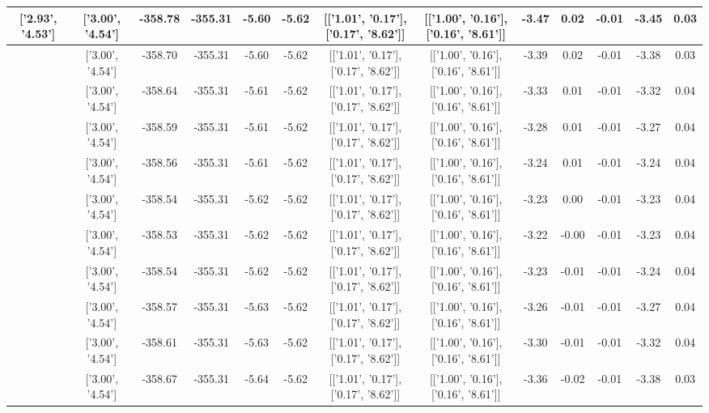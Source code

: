 \begin{table}[htbp]
\begin{adjustbox}{angle=90}
\begin{tabular}{|c|c|c|c|c|c|c|c|c|c|c|c|c|}
 ['2.93', '4.53'] & ['3.00', '4.54'] & -358.78 & -355.31 & -5.60 & -5.62 & [['1.01', '0.17'], ['0.17', '8.62']] & [['1.00', '0.16'], ['0.16', '8.61']] & -3.47 & 0.02 & -0.01 & -3.45 & 0.03\\ \hline
 ['2.94', '4.53'] & ['3.00', '4.54'] & -358.70 & -355.31 & -5.60 & -5.62 & [['1.01', '0.17'], ['0.17', '8.62']] & [['1.00', '0.16'], ['0.16', '8.61']] & -3.39 & 0.02 & -0.01 & -3.38 & 0.03\\ \hline
 ['2.95', '4.54'] & ['3.00', '4.54'] & -358.64 & -355.31 & -5.61 & -5.62 & [['1.01', '0.17'], ['0.17', '8.62']] & [['1.00', '0.16'], ['0.16', '8.61']] & -3.33 & 0.01 & -0.01 & -3.32 & 0.04\\ \hline
 ['2.97', '4.54'] & ['3.00', '4.54'] & -358.59 & -355.31 & -5.61 & -5.62 & [['1.01', '0.17'], ['0.17', '8.62']] & [['1.00', '0.16'], ['0.16', '8.61']] & -3.28 & 0.01 & -0.01 & -3.27 & 0.04\\ \hline
 ['2.98', '4.54'] & ['3.00', '4.54'] & -358.56 & -355.31 & -5.61 & -5.62 & [['1.01', '0.17'], ['0.17', '8.62']] & [['1.00', '0.16'], ['0.16', '8.61']] & -3.24 & 0.01 & -0.01 & -3.24 & 0.04\\ \hline
 ['2.99', '4.54'] & ['3.00', '4.54'] & -358.54 & -355.31 & -5.62 & -5.62 & [['1.01', '0.17'], ['0.17', '8.62']] & [['1.00', '0.16'], ['0.16', '8.61']] & -3.23 & 0.00 & -0.01 & -3.23 & 0.04\\ \hline
 ['3.00', '4.54'] & ['3.00', '4.54'] & -358.53 & -355.31 & -5.62 & -5.62 & [['1.01', '0.17'], ['0.17', '8.62']] & [['1.00', '0.16'], ['0.16', '8.61']] & -3.22 & -0.00 & -0.01 & -3.23 & 0.04\\ \hline
 ['3.01', '4.54'] & ['3.00', '4.54'] & -358.54 & -355.31 & -5.62 & -5.62 & [['1.01', '0.17'], ['0.17', '8.62']] & [['1.00', '0.16'], ['0.16', '8.61']] & -3.23 & -0.01 & -0.01 & -3.24 & 0.04\\ \hline
 ['3.03', '4.54'] & ['3.00', '4.54'] & -358.57 & -355.31 & -5.63 & -5.62 & [['1.01', '0.17'], ['0.17', '8.62']] & [['1.00', '0.16'], ['0.16', '8.61']] & -3.26 & -0.01 & -0.01 & -3.27 & 0.04\\ \hline
 ['3.04', '4.54'] & ['3.00', '4.54'] & -358.61 & -355.31 & -5.63 & -5.62 & [['1.01', '0.17'], ['0.17', '8.62']] & [['1.00', '0.16'], ['0.16', '8.61']] & -3.30 & -0.01 & -0.01 & -3.32 & 0.04\\ \hline
 ['3.05', '4.54'] & ['3.00', '4.54'] & -358.67 & -355.31 & -5.64 & -5.62 & [['1.01', '0.17'], ['0.17', '8.62']] & [['1.00', '0.16'], ['0.16', '8.61']] & -3.36 & -0.02 & -0.01 & -3.38 & 0.03\\ \hline

\end{tabular}
\end{adjustbox}
\end{table}
